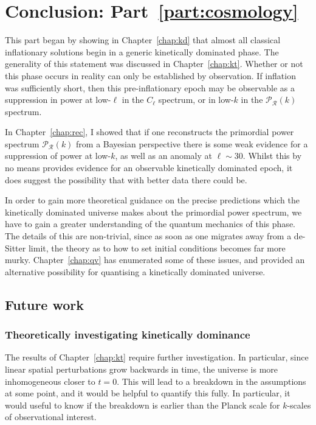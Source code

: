 \chapter*{Conclusion: Part~\ref{part:cosmology}}

This part began by showing in Chapter~\ref{chap:kd} that almost all classical inflationary solutions begin in a generic kinetically dominated phase. The generality of this statement was discussed in Chapter~\ref{chap:kt}. 
Whether or not this phase occurs in reality can only be established by observation. If inflation was sufficiently short, then this pre-inflationary epoch may be observable as a suppression in power at low-$\ell$ in the $C_\ell$ spectrum, or in low-$k$ in the $\mathcal{P}_\mathcal{R}(k)$ spectrum. 

In Chapter~\ref{chap:rec}, I showed that if one reconstructs the primordial power spectrum $\mathcal{P}_\mathcal{R}(k)$ from a Bayesian perspective there is some weak evidence for a suppression of power at low-$k$, as well as an anomaly at $\ell\sim30$. Whilst this by no means provides evidence for an observable kinetically dominated epoch, it does suggest the possibility that with better data there could be.

In order to gain more theoretical guidance on the precise predictions which the kinetically dominated universe makes about the primordial power spectrum, we have to gain a greater understanding of the quantum mechanics of this phase. The details of this are non-trivial, since as soon as one migrates away from a de-Sitter limit, the theory as to how to set initial conditions becomes far more murky. Chapter~\ref{chap:qv} has enumerated some of these issues, and provided an alternative possibility for quantising a kinetically dominated universe.

\section*{Future work}
\subsection*{Theoretically investigating kinetically dominance}
The results of Chapter~\ref{chap:kt} require further investigation. In particular, since linear spatial perturbations grow backwards in time, the universe is more inhomogeneous closer to $t=0$. This will lead to a breakdown in the assumptions at some point, and it would be helpful to quantify this fully. In particular, it would useful to know if the breakdown is earlier than the Planck scale for $k$-scales of observational interest.

